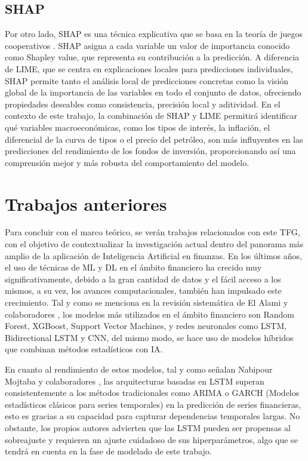 \subsection{SHAP}
Por otro lado, SHAP \cite{xai_shap} es una técnica explicativa que se basa en la teoría de juegos cooperativos \cite{juegos_cooperativos}. SHAP asigna a cada variable un valor de importancia conocido como Shapley value, que representa su contribución a la predicción. A diferencia de LIME, que se centra en explicaciones locales para predicciones individuales, SHAP permite tanto el análisis local de predicciones concretas como la visión global de la importancia de las variables en todo el conjunto de datos, ofreciendo propiedades deseables como consistencia, precisión local y aditividad. En el contexto de este trabajo, la combinación de SHAP y LIME permitirá identificar qué variables macroeconómicas, como los tipos de interés, la inflación, el diferencial de la curva de tipos o el precio del petróleo, son más influyentes en las predicciones del rendimiento de los fondos de inversión, proporcionando así una comprensión mejor y más robusta del comportamiento del modelo.

\section{Trabajos anteriores}
Para concluir con el marco teórico, se verán trabajos relacionados con este TFG, con el objetivo de contextualizar la investigación actual dentro del panorama más amplio de la aplicación de Inteligencia Artificial en finanzas. En los últimos años, el uso de técnicas de ML y DL en el ámbito financiero ha crecido muy significativamente, debido a la gran cantidad de datos y el fácil acceso a los mismos, a su vez, los avances computacionales, también han impulsado este crecimiento. Tal y como se menciona en la revisión sistemática de El Alami y colaboradores \cite{elalami2025}, los modelos más utilizados en el ámbito financiero son Random Forest, XGBoost, Support Vector Machines, y redes neuronales como LSTM, Bidirectional LSTM y CNN, del mismo modo, se hace uso de modelos híbridos que combinan métodos estadísticos con IA.

En cuanto al rendimiento de estos modelos, tal y como señalan Nabipour Mojtaba y colaboradores \cite{nabipour2020}, las arquitecturas basadas en LSTM superan consistentemente a los métodos tradicionales como ARIMA \cite{arima} o GARCH \cite{garch} (Modelos estadísticos clásicos para series temporales) en la predicción de series financieras, esto es gracias a su capacidad para capturar dependencias temporales largas. No obstante, los propios autores advierten que las LSTM pueden ser propensas al sobreajuste y requieren un ajuste cuidadoso de sus hiperparámetros, algo que se tendrá en cuenta en la fase de modelado de este trabajo.


